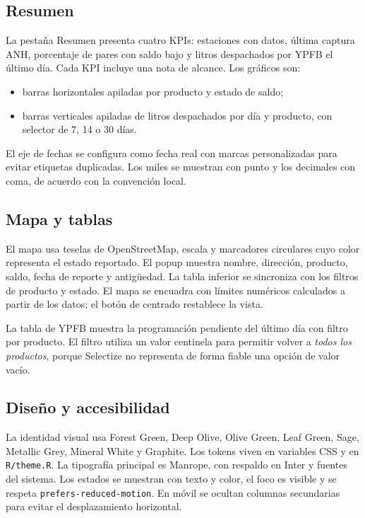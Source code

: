 \documentclass[12pt,a4paper]{article}
\newcommand{\archivo}[1]{\texttt{#1}}
\begin{document}
\subsection{Resumen}

La pestaña Resumen presenta cuatro KPIs: estaciones con datos, última captura ANH, porcentaje de pares con saldo bajo y litros despachados por YPFB el último día. Cada KPI incluye una nota de alcance. Los gráficos son:
\begin{itemize}[leftmargin=1.2cm]
  \item barras horizontales apiladas por producto y estado de saldo;
  \item barras verticales apiladas de litros despachados por día y producto, con selector de 7, 14 o 30 días.
\end{itemize}

El eje de fechas se configura como fecha real con marcas personalizadas para evitar etiquetas duplicadas. Los miles se muestran con punto y los decimales con coma, de acuerdo con la convención local.

\subsection{Mapa y tablas}

El mapa usa teselas de OpenStreetMap, escala y marcadores circulares cuyo color representa el estado reportado. El popup muestra nombre, dirección, producto, saldo, fecha de reporte y antigüedad. La tabla inferior se sincroniza con los filtros de producto y estado. El mapa se encuadra con límites numéricos calculados a partir de los datos; el botón de centrado restablece la vista.

La tabla de YPFB muestra la programación pendiente del último día con filtro por producto. El filtro utiliza un valor centinela para permitir volver a \emph{todos los productos}, porque Selectize no representa de forma fiable una opción de valor vacío.

\subsection{Diseño y accesibilidad}

La identidad visual usa Forest Green, Deep Olive, Olive Green, Leaf Green, Sage, Metallic Grey, Mineral White y Graphite. Los tokens viven en variables CSS y en \archivo{R/theme.R}. La tipografía principal es Manrope, con respaldo en Inter y fuentes del sistema. Los estados se muestran con texto y color, el foco es visible y se respeta \texttt{prefers-reduced-motion}. En móvil se ocultan columnas secundarias para evitar el desplazamiento horizontal.
\end{document}
